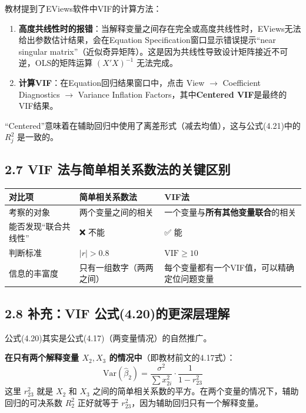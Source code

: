 \documentclass[12pt,a4paper]{ctexart}
\begin{document}
教材提到了EViews软件中VIF的计算方法：

\begin{enumerate}
  \item \textbf{高度共线性时的报错}：当解释变量之间存在完全或高度共线性时，EViews无法给出参数估计结果，会在Equation Specification窗口显示错误提示``near singular matrix''（近似奇异矩阵）。这是因为共线性导致设计矩阵接近不可逆，OLS的矩阵运算 $(X'X)^{-1}$ 无法完成。
  \item \textbf{计算VIF}：在Equation回归结果窗口中，点击 View $\rightarrow$ Coefficient Diagnostics $\rightarrow$ Variance Inflation Factors，其中\textbf{Centered VIF}是最终的VIF结果。
\end{enumerate}

``Centered''意味着在辅助回归中使用了离差形式（减去均值），这与公式(4.21)中的 $R_j^2$ 是一致的。

\subsection*{2.7 VIF 法与简单相关系数法的关键区别}

\begin{center}
\begin{tabular}{p{3cm} p{4cm} p{4cm}}
\toprule
\textbf{对比项} & \textbf{简单相关系数法} & \textbf{VIF法} \\
\midrule
考察的对象 & 两个变量之间的相关 & 一个变量与\textbf{所有其他变量联合}的相关 \\
能否发现“联合共线性” & ❌ 不能 & ✅ 能 \\
判断标准 & $|r| > 0.8$ & $\text{VIF} \geq 10$ \\
信息的丰富度 & 只有一组数字（两两之间） & 每个变量都有一个VIF值，可以精确定位问题变量 \\
\bottomrule
\end{tabular}
\end{center}

\subsection*{2.8 补充：VIF 公式(4.20)的更深层理解}

公式(4.20)其实是公式(4.17)（两变量情况）的自然推广。

\textbf{在只有两个解释变量 $X_2, X_3$ 的情况中}（即教材前文的4.17式）：
\[
\text{Var}(\hat{\beta}_2) = \frac{\sigma^2}{\sum x_{2i}^2} \cdot \frac{1}{1 - r_{23}^2}
\]
这里 $r_{23}^2$ 就是 $X_2$ 和 $X_3$ 之间的简单相关系数的平方。在两个变量的情况下，辅助回归的可决系数 $R_2^2$ 正好就等于 $r_{23}^2$，因为辅助回归只有一个解释变量。
\end{document}
